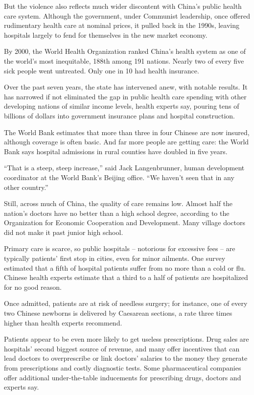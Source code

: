 ﻿\documentclass[12pt]{article}
\begin{document}
But the violence also reflects much wider discontent with China's public health care system.
Although the government, under Communist leadership, once offered rudimentary health care at nominal
prices, it pulled back in the 1990s, leaving hospitals largely to fend for themselves in the new
market economy.

By 2000, the World Health Organization ranked China's health system as one of the world's most
inequitable, 188th among 191 nations. Nearly two of every five sick people went untreated. Only one
in 10 had health insurance.

Over the past seven years, the state has intervened anew, with notable results. It has narrowed if
not eliminated the gap in public health care spending with other developing nations of similar
income levels, health experts say, pouring tens of billions of dollars into government insurance
plans and hospital construction.

The World Bank estimates that more than three in four Chinese are now insured, although coverage is
often basic. And far more people are getting care: the World Bank says hospital admissions in rural
counties have doubled in five years.

``That is a steep, steep increase,'' said Jack Langenbrunner, human development coordinator at the
World Bank's Beijing office. ``We haven't seen that in any other country.''

Still, across much of China, the quality of care remains low. Almost half the nation's doctors have
no better than a high school degree, according to the Organization for Economic Cooperation and
Development. Many village doctors did not make it past junior high school.

Primary care is scarce, so public hospitals -- notorious for excessive fees -- are typically
patients' first stop in cities, even for minor ailments. One survey estimated that a fifth of
hospital patients suffer from no more than a cold or flu. Chinese health experts estimate that a
third to a half of patients are hospitalized for no good reason.

Once admitted, patients are at risk of needless surgery; for instance, one of every two Chinese
newborns is delivered by Caesarean sections, a rate three times higher than health experts
recommend.

Patients appear to be even more likely to get useless prescriptions. Drug sales are hospitals'
second biggest source of revenue, and many offer incentives that can lead doctors to overprescribe
or link doctors' salaries to the money they generate from prescriptions and costly diagnostic tests.
Some pharmaceutical companies offer additional under-the-table inducements for prescribing drugs,
doctors and experts say.
\end{document}
